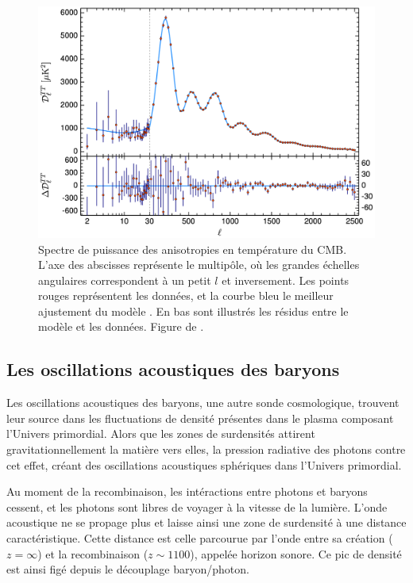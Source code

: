 \documentclass[../main/main.tex]{subfiles}
\begin{document}
\begin{figure}[ht]
  \begin{minipage}[c]{0.55\textwidth}
    \includegraphics[width=\textwidth]{../figures/01_cosmology/cmbTTplanck.pdf}
  \end{minipage}\hfill
  \begin{minipage}[c]{0.44\textwidth}
    \caption[Spectre de puissance des anisotropies en température du
    CMB.]{Spectre de puissance des anisotropies en température du
    CMB. L'axe des abscisses représente le multipôle, où les grandes
    échelles angulaires correspondent à un petit $l$ et inversement. Les
    points rouges représentent les données, et la courbe bleu le
    meilleur ajustement du modèle \lcdm. En bas sont illustrés les
    résidus entre le modèle et les données. Figure de \citet{Planckparams2018}.}\label{fig:cmbTTplanck}
  \end{minipage}
\end{figure}

\subsection{Les oscillations acoustiques des baryons}

Les oscillations acoustiques des baryons, une autre sonde cosmologique,
trouvent leur source dans les
fluctuations de densité présentes dans le plasma composant l'Univers
primordial. Alors que les zones de surdensités attirent
gravitationnellement la matière vers elles, la pression radiative des
photons contre cet effet, créant des oscillations acoustiques sphériques
dans l'Univers primordial.

Au moment de la recombinaison, les intéractions entre photons et baryons cessent,
et les photons sont libres de voyager à la vitesse de la lumière. L'onde acoustique ne se
propage plus et laisse ainsi une zone de surdensité à une distance
caractéristique. Cette distance est celle 
parcourue par l'onde entre sa création ($z=\infty$) et la
recombinaison ($z\sim1100$), appelée horizon sonore. Ce pic de densité est ainsi figé
depuis le découplage baryon/photon.
\end{document}
